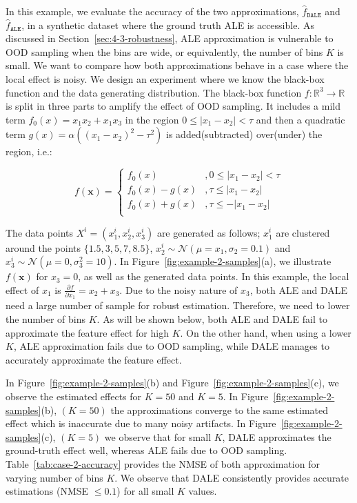 \documentclass[wcp]{jmlr}
\newcommand{\dale}{\hat{f}_{\mathtt{DALE}}}
\newcommand{\xb}{\mathbf{x}} \newcommand{\R}{\mathbb{R}}
\begin{document}
In this example, we evaluate the accuracy of the two approximations,
\(\dale\) and \(\hat{f}_{\mathtt{ALE}}\), in a synthetic
dataset where the ground truth ALE is accessible. As discussed in
Section~\ref{sec:4-3-robustness}, ALE approximation is vulnerable to
OOD sampling when the bins are wide, or equivalently, the number of
bins \(K\) is small. We want to compare how both approximations behave
in a case where the local effect is noisy.
%
We design an experiment where we know the black-box function and the
data generating distribution. The black-box function
\(f:\R^3 \rightarrow \R\) is split in three parts to amplify the
effect of OOD sampling. It includes a mild term
\( f_0(x) = x_1x_2 + x_1x_3 \) in the region
\( 0 \leq |x_1 - x_2| < \tau \) and then a quadratic term
\(g(x) = \alpha ((x_1 - x_2)^2 - \tau^2)\) is added(subtracted)
over(under) the region, i.e.:

\begin{equation} \label{eq:example-2-mapping}
  f(\mathbf{x}) =
  \begin{cases}
    f_0(x) & , 0 \leq |x_1 - x_2|  < \tau \\
    f_0(x) - g(x) & , \tau \leq |x_1 - x_2|  \\
    f_0(x) + g(x) & , \tau \leq - |x_1 - x_2|  \\
  \end{cases}
\end{equation}

\noindent
%
The data points \(X^i = (x_1^i, x_2^i, x_3^i)\) are generated as
follows; \(x_1^i \) are clustered around the points
\(\{1.5, 3, 5, 7, 8.5\}\),
\(x_2^i \sim \mathcal{N}(\mu=x_1, \sigma_2=0.1) \) and
\(x_3^i \sim \mathcal{N}(\mu=0, \sigma_3^2=10) \). In
Figure~\ref{fig:example-2-samples}(a), we illustrate \(f(\xb)\) for
\(x_3=0\), as well as the generated data points. In this example, the
local effect of \(x_1\) is
\(\frac{\partial f}{\partial x_1} = x_2 + x_3\). Due to the noisy
nature of \(x_3\), both ALE and DALE need a large number of sample for
robust estimation. Therefore, we need to lower the number of bins
\(K\). As will be shown below, both ALE and DALE fail to approximate
the feature effect for high \(K\). On the other hand, when using a
lower \(K\), ALE approximation fails due to OOD sampling, while DALE
manages to accurately approximate the feature effect.

In Figure~\ref{fig:example-2-samples}(b) and
Figure~\ref{fig:example-2-samples}(c), we observe the estimated
effects for \(K=50\) and \(K=5\). In
Figure~\ref{fig:example-2-samples}(b), \((K=50)\) the approximations
converge to the same estimated effect which is inaccurate due to many
noisy artifacts. In Figure~\ref{fig:example-2-samples}(c), \((K=5)\)
we observe that for small \(K\), DALE approximates the ground-truth
effect well, whereas ALE fails due to OOD
sampling. Table~\ref{tab:case-2-accuracy} provides the NMSE of both
approximation for varying number of bins \(K\). We observe that DALE
consistently provides accurate estimations (NMSE \(\leq 0.1\)) for all
small \(K\) values.
\end{document}
